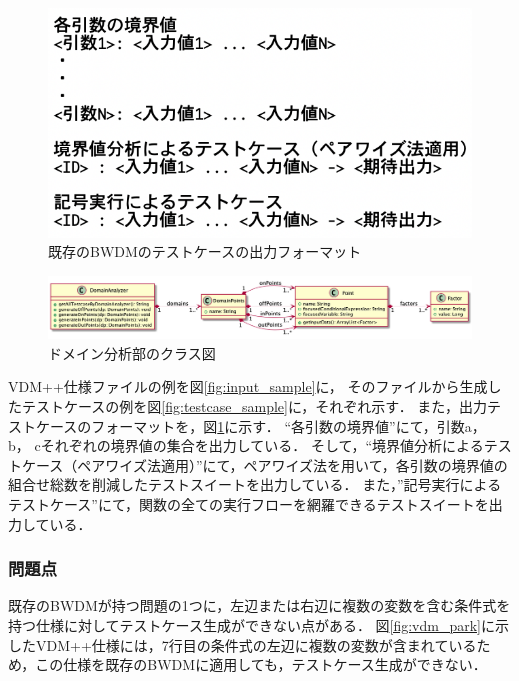 \documentclass[uplatex, report, a4j, 10pt]{jsbook}
\begin{document}
\begin{figure}[t]
	\begin{center}
		\includegraphics[keepaspectratio, width=160mm]{figs/bwdm_format.png}
		\caption{既存のBWDMのテストケースの出力フォーマット}
		\label{fig:bwdm_format}
	\end{center}
\end{figure}

\begin{figure}[t]
	\begin{center}
		\includegraphics[keepaspectratio, width=160mm]{figs/DomainAnalyzer.png}
		\caption{ドメイン分析部のクラス図}
		\label{fig:class_DomainAnalyzer}
	\end{center}
\end{figure}

VDM++仕様ファイルの例を図\ref{fig:input_sample}に，
そのファイルから生成したテストケースの例を図\ref{fig:testcase_sample}に，それぞれ示す．
また，出力テストケースのフォーマットを，図\ref{fig:bwdm_format}に示す．
“各引数の境界値”にて，引数a， b， cそれぞれの境界値の集合を出力している．
そして，“境界値分析によるテストケース（ペアワイズ法適用）”にて，ペアワイズ法を用いて，各引数の境界値の組合せ総数を削減したテストスイートを出力している．
また，”記号実行によるテストケース”にて，関数の全ての実行フローを網羅できるテストスイートを出力している．

\subsubsection{問題点}\label{sec:bwdm_problem}
既存のBWDMが持つ問題の1つに，左辺または右辺に複数の変数を含む条件式を持つ仕様に対してテストケース生成ができない点がある．
図\ref{fig:vdm_park}に示したVDM++仕様には，7行目の条件式の左辺に複数の変数が含まれているため，この仕様を既存のBWDMに適用しても，テストケース生成ができない．
\end{document}
